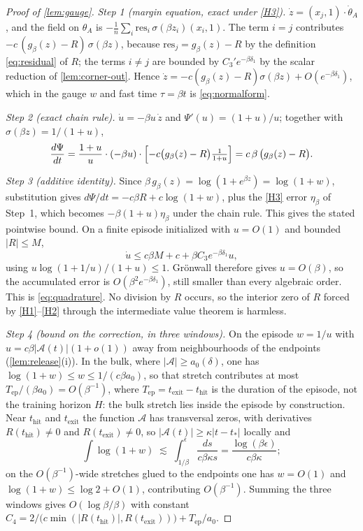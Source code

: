 \documentclass[11pt]{article}
\theoremstyle{definition}
\theoremstyle{remark}
\newcommand{\thit}{t_{\mathrm{hit}}}
\newcommand{\texit}{t_{\mathrm{exit}}}
\newcommand{\Ar}{\mathcal{A}}                      %
\newcommand{\Tep}{T_{\mathrm{ep}}}   %
\begin{document}
\begin{proof}[Proof of \cref{lem:gauge}]
\emph{Step 1 (margin equation, exact under \eqref{H3}).}
$\dot z=(x_j,1)\cdot\dot\theta_A$, and the field on $\theta_A$ is
$-\tfrac1n\sum_i\mathrm{res}_i\,\sigma(\beta z_i)(x_i,1)$. The term $i=j$
contributes $-c\,(g_\beta(z)-R)\,\sigma(\beta z)$, because
$\mathrm{res}_j=g_\beta(z)-R$ by the definition \eqref{eq:residual} of $R$; the
terms $i\ne j$ are bounded by $C_3'e^{-\beta\delta_1}$ by the scalar reduction of
\cref{lem:corner-out}. Hence
$\dot z=-c(g_\beta(z)-R)\sigma(\beta z)+O(e^{-\beta\delta_1})$, which in the
gauge $w$ and fast time $\tau=\beta t$ is \eqref{eq:normalform}.

\emph{Step 2 (exact chain rule).} $\dot u=-\beta u\,\dot z$ and
$\Psi'(u)=(1+u)/u$; together with $\sigma(\beta z)=1/(1+u)$,
\[
\frac{d\Psi}{dt}
=\frac{1+u}{u}\cdot(-\beta u)\cdot
\Bigl[-c\bigl(g_\beta(z)-R\bigr)\tfrac{1}{1+u}\Bigr]
=c\,\beta\,\bigl(g_\beta(z)-R\bigr).
\]

\emph{Step 3 (additive identity).} Since $\beta\,g_\beta(z)=\log(1+e^{\beta z})
=\log(1+w)$, substitution gives $d\Psi/dt=-c\beta R+c\log(1+w)$, plus the
\eqref{H3} error $\eta_\beta$ of Step~1, which becomes
$-\beta(1+u)\eta_\beta$ under the chain rule. This gives the stated pointwise
bound. On a finite episode initialized with $u=O(1)$ and bounded $|R|\le M$,
\[
\dot u\le c\beta M+c+\beta C_3e^{-\beta\delta_1}u,
\]
using $u\log(1+1/u)/(1+u)\le1$. Gr\"onwall therefore gives $u=O(\beta)$,
so the accumulated error is $O(\beta^2e^{-\beta\delta_1})$, still smaller than
every algebraic order. This is \eqref{eq:quadrature}. No division by $R$
occurs, so the interior zero of $R$ forced by \eqref{H1}--\eqref{H2} through the
intermediate value theorem is harmless.

\emph{Step 4 (bound on the correction, in three windows).} On the episode
$w=1/u$ with $u=c\beta|\Ar(t)|(1+o(1))$ away from neighbourhoods of the endpoints
(\cref{lem:release}(i)). In the bulk, where $|\Ar|\ge a_0(\delta)$, one has
$\log(1+w)\le w\le 1/(c\beta a_0)$, so that stretch contributes at most
$\Tep/(\beta a_0)=O(\beta^{-1})$, where $\Tep=\texit-\thit$ is the duration of the
episode, not the training horizon $H$: the bulk stretch lies inside the episode by
construction. Near $\thit$ and $\texit$ the function $\Ar$ has
transversal zeros, with derivatives $R(\thit)\ne0$ and $R(\texit)\ne0$, so
$|\Ar(t)|\ge\kappa|t-t_\ast|$ locally and
\[
\int\log(1+w)\;\lesssim\;\int_{1/\beta}^{\epsilon}\frac{ds}{c\beta\kappa s}
=\frac{\log(\beta\epsilon)}{c\beta\kappa};
\]
on the $O(\beta^{-1})$-wide stretches glued to the endpoints one has $w=O(1)$ and
$\log(1+w)\le\log2+O(1)$, contributing $O(\beta^{-1})$. Summing the three windows
gives $O(\log\beta/\beta)$ with constant
$C_4=2/\bigl(c\min(|R(\thit)|,R(\texit))\bigr)+\Tep/a_0$.
\end{proof}
\end{document}
